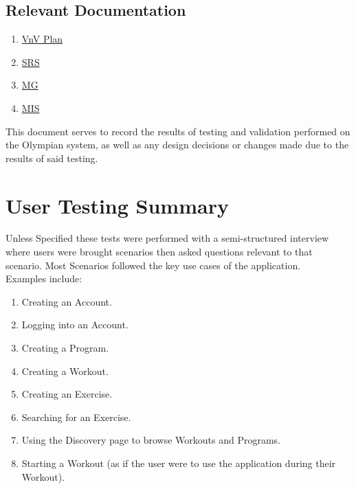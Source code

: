 \documentclass[12pt, titlepage]{article}
\begin{document}
\newpage

\tableofcontents

\listoftables %

\newpage


\subsection{Relevant Documentation}

\begin{enumerate}
	\item \href{https://github.com/dimitritsampiras/olympian/blob/main/docs/VnVPlan/VnVPlan.pdf}{VnV Plan}
	\item \href{https://github.com/dimitritsampiras/olympian/blob/main/docs/SRS/SRS.pdf}{SRS} 
	\item \href{https://github.com/dimitritsampiras/olympian/blob/main/docs/Design/MG/MG.pdf}{MG} 
	\item \href{https://github.com/dimitritsampiras/olympian/blob/main/docs/Design/MIS/MIS.pdf}{MIS} 	
\end{enumerate}

This document serves to record the results of testing and validation performed on the Olympian system, as well as any design decisions or changes made due to the results of said testing.

\section{User Testing Summary}
Unless Specified these tests were performed with a semi-structured interview where users were brought scenarios then asked questions relevant to that scenario. Most Scenarios followed the key use cases of the application.\\
Examples include:
\begin{enumerate}
	\item Creating an Account.
	\item Logging into an Account.
	\item Creating a Program.
	\item Creating a Workout.
	\item Creating an Exercise.
	\item Searching for an Exercise.
	\item Using the Discovery page to browse Workouts and Programs.
	\item Starting a Workout (as if the user were to use the application during their Workout).
\end{enumerate}
\end{document}
